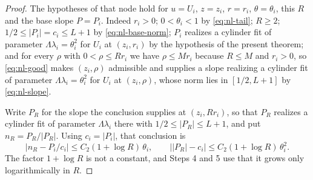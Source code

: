 \begin{proof}
The hypotheses of that node hold for $u=U_i$, $z=z_i$, $r=r_i$, $\theta=\theta_i$,
this $R$ and the base slope $P=P_i$. Indeed $r_i>0$; $0<\theta_i<1$ by
\eqref{eq:nl-tail}; $R\ge2$; $1/2\le|P_i|=c_i\le L+1$ by \eqref{eq:nl-base-norm};
$P_i$ realizes a cylinder fit of parameter $\Lambda\lambda_i=\theta_i^2$ for $U_i$ at
$(z_i,r_i)$ by the hypothesis of the present theorem; and for every $\rho$ with
$0<\rho\le Rr_i$ we have $\rho\le Mr_i$ because $R\le M$ and $r_i>0$, so
\eqref{eq:nl-good} makes $(z_i,\rho)$ admissible and supplies a slope realizing a
cylinder fit of parameter $\Lambda\lambda_i=\theta_i^2$ for $U_i$ at $(z_i,\rho)$,
whose norm lies in $[1/2,L+1]$ by \eqref{eq:nl-slope}.

Write $P_R$ for the slope the conclusion supplies at $(z_i,Rr_i)$, so that $P_R$
realizes a cylinder fit of parameter $\Lambda\lambda_i$ there with
$1/2\le|P_R|\le L+1$, and put $n_R=P_R/|P_R|$. Using $c_i=|P_i|$, that conclusion is
\begin{equation}\label{eq:nl-base-chain}
  |n_R-P_i/c_i|\le C_2(1+\log R)\,\theta_i,\qquad
  \bigl||P_R|-c_i\bigr|\le C_2(1+\log R)\,\theta_i^2 .
\end{equation}
The factor $1+\log R$ is not a constant, and Steps 4 and 5 use that it grows only
logarithmically in $R$.


\end{proof}
